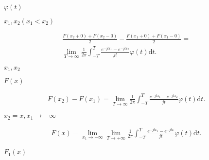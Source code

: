 \begin{preview}
\setcounter{equation}{0}%
\(\varphi(t)\)
\end{preview}

\begin{preview}
\setcounter{equation}{0}%
\(x_1, x_2(x_1 < x_2)\)
\end{preview}

\begin{preview}
\setcounter{equation}{0}%
\begin{align}
  \frac{F(x_2 + 0) + F(x_2 - 0)}{2} - \frac{F(x_1 + 0) + F(x_1 - 0)}{2} =\\ \lim_{T \rightarrow \infty} \frac{1}{2\pi} \int^T_{-T} \frac{e^{-jtx_1} - e^{-jtx_2}}{jt} \varphi(t) \mathrm{d}t.
\end{align}

\end{preview}

\begin{preview}
\setcounter{equation}{0}%
\(x_1, x_2\)
\end{preview}

\begin{preview}
\setcounter{equation}{0}%
\(F(x)\)
\end{preview}

\begin{preview}
\setcounter{equation}{0}%
\begin{align}
  F(x_2) - F(x_1) = \lim_{T \rightarrow \infty} \frac{1}{2\pi}\int^T_{-T} \frac{e^{-jtx_1} - e^{-jtx_2}}{jt}\varphi(t) \mathrm{d}t.
\end{align}

\end{preview}

\begin{preview}
\setcounter{equation}{0}%
\(x_2 = x, x_1 \rightarrow -\infty\)
\end{preview}

\begin{preview}
\setcounter{equation}{0}%
\begin{align}
  F(x) = \lim_{x_1 \rightarrow -\infty} \lim_{T \rightarrow +\infty} \frac{1}{2\pi} \int_{-T}^{T}\frac{e^{-jtx_1} - e^{-jtx}}{jt}\varphi(t) \mathrm{d}t.
\end{align}

\end{preview}

\begin{preview}
\setcounter{equation}{0}%
\(F_1(x)\)
\end{preview}

